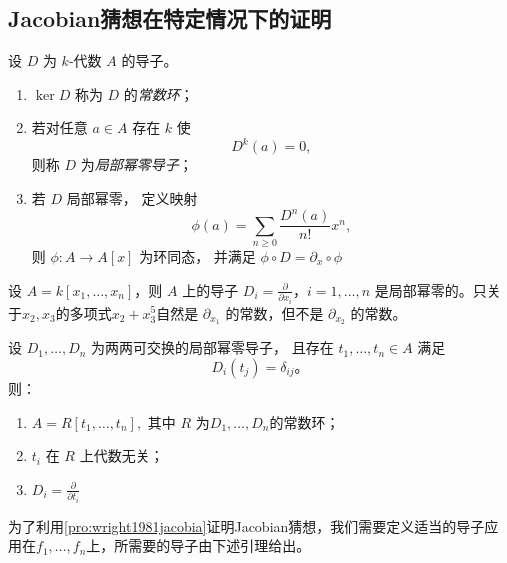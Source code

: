 \subsection{Jacobian猜想在特定情况下的证明}

\begin{definition}
    设 $D$ 为 $k$-代数 $A$ 的导子。
    \begin{enumerate}
        \item
              $\ker D$ 称为 $D$ 的\emph{常数环}；

        \item
              若对任意 $a\in A$
              存在 $k$ 使
              \[
                  D^k(a)=0,
              \]
              则称 $D$ 为\emph{局部幂零导子}；

        \item
              若 $D$ 局部幂零，
              定义映射
              \[
                  \phi(a)=
                  \sum_{n\ge0}
                  \frac{D^n(a)}{n!}x^n,
              \]
              则 $\phi:A\to A[x]$
              为环同态，
              并满足  $\phi\circ D=\partial_x\circ\phi$
    \end{enumerate}
\end{definition}
\begin{example}
    设 $A=k[x_1,\dots,x_n]$，则 $A$ 上的导子 $D_i=\frac{\partial}{\partial x_i}$，$i=1,\dots,n$ 是局部幂零的。只关于$x_2,x_3$的多项式$x_2+x_3^5$自然是 $\partial_{x_1}$ 的常数，但不是 $\partial_{x_2}$ 的常数。
\end{example}
\begin{proposition}
    \label{pro:wright1981jacobia}
    设
    $D_1,\dots,D_n$
    为两两可交换的局部幂零导子，
    且存在
    $t_1,\dots,t_n\in A$
    满足
    \[
        D_i(t_j)=\delta_{ij}。
    \]
    则：

    \begin{enumerate}
        \item  $A=R[t_1,\dots,t_n],$
              其中 $R$ 为$D_1,\dots,D_n$的常数环；

        \item
              $t_i$ 在 $R$ 上代数无关；

        \item
              $ D_i=\frac{\partial}{\partial t_i}$
    \end{enumerate}
\end{proposition}

为了利用\ref{pro:wright1981jacobia}证明Jacobian猜想，我们需要定义适当的导子应用在$f_1,\dots,f_n$上，所需要的导子由下述引理给出。

